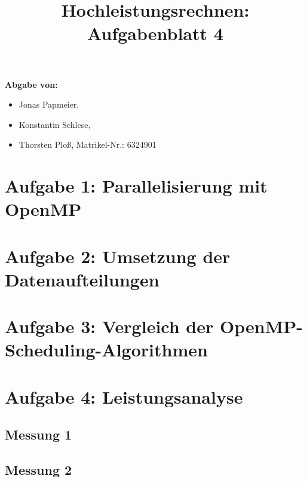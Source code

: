 \documentclass[a4paper]{article}
\title{Hochleistungsrechnen: Aufgabenblatt 4}
\author{}
\date{}
\begin{document}
	\maketitle
	\textbf{Abgabe von:}
	\begin{itemize}
		\item Jonas Papmeier, 
		\item Konstantin Schlese, 
		\item Thorsten Ploß, Matrikel-Nr.: 6324901
	\end{itemize}
	\section*{Aufgabe 1: Parallelisierung mit OpenMP}
	\section*{Aufgabe 2: Umsetzung der Datenaufteilungen}
	\section*{Aufgabe 3: Vergleich der OpenMP-Scheduling-Algorithmen}
	\section*{Aufgabe 4: Leistungsanalyse}
	\subsection*{Messung 1}
	\subsection*{Messung 2}
\end{document}

